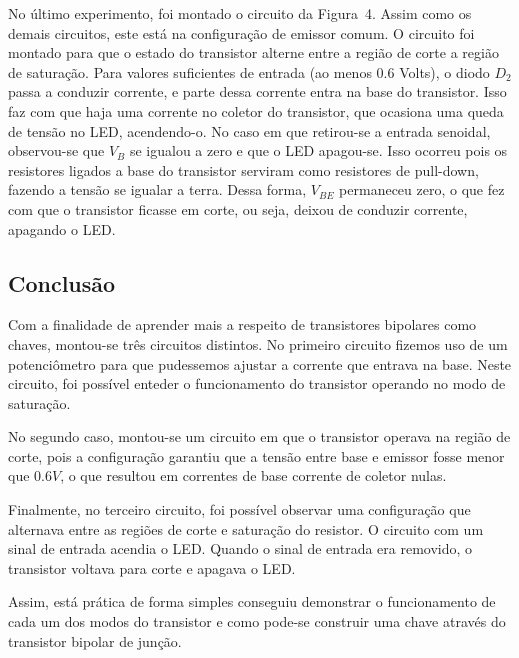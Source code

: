 \documentclass[12pt,a4paper]{article}
\begin{document}
No último experimento, foi montado o circuito da Figura~4.  
Assim como  os demais circuitos, este está na configuração de emissor comum. O circuito 
foi montado para que o estado do transistor alterne entre a região de corte a região de saturação. 
Para valores suficientes de entrada (ao menos $0.6$ Volts), o diodo $D_2$
passa a conduzir corrente, e parte dessa corrente entra na base do transistor. Isso faz com
que haja uma corrente no coletor do transistor, que ocasiona uma queda de tensão no
LED, acendendo-o. No caso em que retirou-se a entrada senoidal, observou-se que $V_B$ se igualou a zero 
e que o LED apagou-se. Isso ocorreu pois os resistores ligados a base do transistor serviram 
como resistores de pull-down, fazendo a tensão se igualar a terra. Dessa forma, 
$V_{BE}$ permaneceu zero, o que fez com que o
transistor ficasse em corte, ou seja, deixou de conduzir corrente, 
apagando o LED.

\newpage
\subsection{Conclusão}
Com a finalidade de aprender mais a respeito de transistores bipolares como chaves,
montou-se três circuitos distintos. No primeiro circuito fizemos uso de um potenciômetro 
para que pudessemos ajustar a corrente que entrava na base. Neste circuito, foi possível 
enteder o funcionamento do transistor operando no modo de saturação.

No segundo caso, montou-se um circuito em que o transistor operava na região de corte, pois
a configuração garantiu que a tensão entre base e emissor fosse menor que $0.6V$, o 
que resultou em correntes de base  corrente de coletor nulas. 

Finalmente, no terceiro circuito, foi possível observar uma configuração que alternava 
entre as regiões de corte e saturação do resistor. O circuito com um sinal de entrada 
acendia o LED. Quando o sinal de entrada era removido, o transistor voltava para corte 
e apagava o LED.

Assim, está prática de forma simples conseguiu demonstrar o funcionamento de cada 
um dos modos do transistor e como pode-se construir uma chave através do transistor
bipolar de junção.
\end{document}

